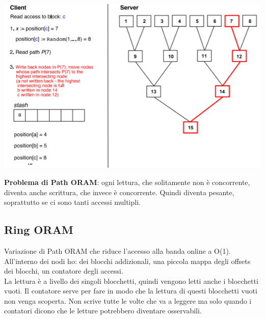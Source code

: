 \begin{center}
    \includegraphics[scale=0.8]{img/poram3.png}
\end{center}
\textbf{Problema di Path ORAM}: ogni lettura, che solitamente non è concorrente, diventa anche scrittura, che invece è concorrente. Quindi diventa pesante, soprattutto se ci sono tanti accessi multipli.
\subsection{Ring ORAM}
Variazione di Path ORAM che riduce l'accesso alla banda online a O(1). All'interno dei nodi ho: dei blocchi addizionali, una piccola mappa degli offsets dei blocchi, un contatore degli accessi.\\
La lettura è a livello dei singoli blocchetti, quindi vengono letti anche i blocchetti vuoti. Il contatore serve per fare in modo che la lettura di questi blocchetti vuoti non venga scoperta.
Non scrive tutte le volte che va a leggere ma solo quando i contatori dicono che le letture potrebbero diventare osservabili. 

